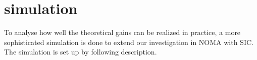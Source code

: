 \section{simulation}
To analyse how well the theoretical gains can be realized in practice, a more
sophisticated simulation is done to extend our investigation in NOMA with SIC.
The simulation is set up by following description.